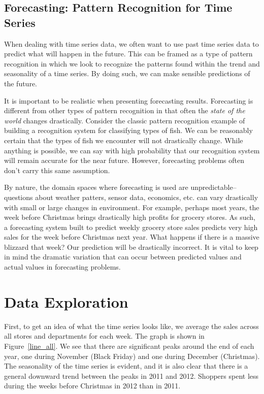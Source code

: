 \documentclass{article}
\begin{document}
\subsection{Forecasting: Pattern Recognition for Time Series}
When dealing with time series data, we often want to use past time series data to predict what will happen in the future. This can be framed as a type of pattern recognition in which we look to recognize the patterns found within the trend and seasonality of a time series. By doing such, we can make sensible predictions of the future.

It is important to be realistic when presenting forecasting results. Forecasting is different from other types of pattern recognition in that often the \emph{state of the world} changes drastically. Consider the classic pattern recognition example of building a recognition system for classifying types of fish. We can be reasonably certain that the types of fish we encounter will not drastically change. While anything is possible, we can say with high probability that our recognition system will remain accurate for the near future. However, forecasting problems often don't carry this same assumption.

By nature, the domain spaces where forecasting is used are unpredictable--questions about weather patters, sensor data, economics, etc. can vary drastically with small or large changes in environment. For example, perhaps most years, the week before Christmas brings drastically high profits for grocery stores. As such, a forecasting system built to predict weekly grocery store sales predicts very high sales for the week before Christmas next year. What happens if there is a massive blizzard that week? Our prediction will be drastically incorrect. It is vital to keep in mind the dramatic variation that can occur between predicted values and actual values in forecasting problems.


\section{Data Exploration}
First, to get an idea of what the time series looks like, we average the sales across all stores and departments for each week. The graph is shown in Figure~\ref{line_all}. We see that there are significant peaks around the end of each year, one during November (Black Friday) and one during December (Christmas). The seasonality of the time series is evident, and it is also clear that there is a general downward trend between the peaks in 2011 and 2012. Shoppers spent less during the weeks before Christmas in 2012 than in 2011.
\end{document}
